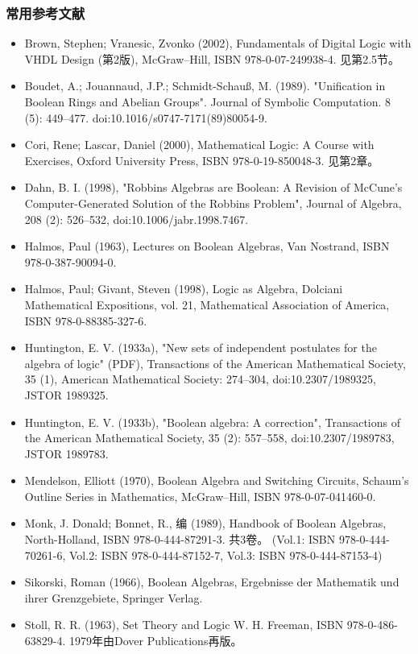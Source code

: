\subsubsection{常用参考文献}
\begin{itemize}
\item Brown, Stephen; Vranesic, Zvonko (2002), Fundamentals of Digital Logic with VHDL Design (第2版), McGraw–Hill, ISBN 978-0-07-249938-4. 见第2.5节。
\item Boudet, A.; Jouannaud, J.P.; Schmidt-Schauß, M. (1989). "Unification in Boolean Rings and Abelian Groups". Journal of Symbolic Computation. 8 (5): 449–477. doi:10.1016/s0747-7171(89)80054-9.
\item Cori, Rene; Lascar, Daniel (2000), Mathematical Logic: A Course with Exercises, Oxford University Press, ISBN 978-0-19-850048-3. 见第2章。
\item Dahn, B. I. (1998), "Robbins Algebras are Boolean: A Revision of McCune's Computer-Generated Solution of the Robbins Problem", Journal of Algebra, 208 (2): 526–532, doi:10.1006/jabr.1998.7467.
\item Halmos, Paul (1963), Lectures on Boolean Algebras, Van Nostrand, ISBN 978-0-387-90094-0.
\item Halmos, Paul; Givant, Steven (1998), Logic as Algebra, Dolciani Mathematical Expositions, vol. 21, Mathematical Association of America, ISBN 978-0-88385-327-6.
\item Huntington, E. V. (1933a), "New sets of independent postulates for the algebra of logic" (PDF), Transactions of the American Mathematical Society, 35 (1), American Mathematical Society: 274–304, doi:10.2307/1989325, JSTOR 1989325.
\item Huntington, E. V. (1933b), "Boolean algebra: A correction", Transactions of the American Mathematical Society, 35 (2): 557–558, doi:10.2307/1989783, JSTOR 1989783.
\item Mendelson, Elliott (1970), Boolean Algebra and Switching Circuits, Schaum's Outline Series in Mathematics, McGraw–Hill, ISBN 978-0-07-041460-0.
\item Monk, J. Donald; Bonnet, R., 编 (1989), Handbook of Boolean Algebras, North-Holland, ISBN 978-0-444-87291-3. 共3卷。 (Vol.1: ISBN 978-0-444-70261-6, Vol.2: ISBN 978-0-444-87152-7, Vol.3: ISBN 978-0-444-87153-4)
\item Sikorski, Roman (1966), Boolean Algebras, Ergebnisse der Mathematik und ihrer Grenzgebiete, Springer Verlag.
\item Stoll, R. R. (1963), Set Theory and Logic W. H. Freeman, ISBN 978-0-486-63829-4. 1979年由Dover Publications再版。
\end{itemize}
